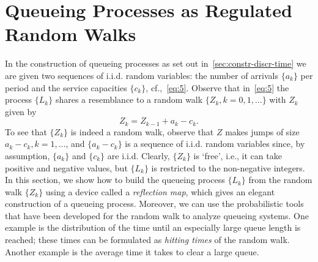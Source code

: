 \section{Queueing Processes as Regulated Random Walks}
\label{sec:queu-proc-as}






In the construction of queueing processes as set out in~\cref{sec:constr-discr-time} we are given two sequences of i.i.d.
random variables: the number of arrivals $\{a_k\}$ per period and the service capacities $\{c_k\}$, cf.,~\cref{eq:5}.
Observe that in~\cref{eq:5} the process $\{L_k\}$ shares a resemblance to a random walk $\{Z_k, k=0,1,\ldots\}$ with $Z_k$ given by
\begin{equation}\label{eq:44}
  Z_k = Z_{k-1} + a_k - c_k.
\end{equation}
To see that $\{Z_k\}$ is indeed a random walk, observe that $Z$ makes jumps of size $a_k-c_k, k=1,\ldots$, and $\{a_k-c_k\}$ is a sequence of i.i.d.
random variables since, by assumption, $\{a_k\}$ and $\{c_k\}$ are i.i.d.
Clearly, $\{Z_k\}$ is `free', i.e., it can take positive and negative values, but $\{L_k\}$ is restricted to the non-negative integers.
In this section, we show how to build the queueing process $\{L_k\}$ from the random walk $\{Z_k\}$ using a device called a \emph{reflection map}, which gives an elegant construction of a queueing process.
Moreover, we can use the probabilistic tools that have been developed for the random walk to analyze queueing systems.
One example is the distribution of the time until an especially large queue length is reached; these times can be formulated as \emph{hitting times} of the random walk.
Another example is the average time it takes to clear a large queue.

